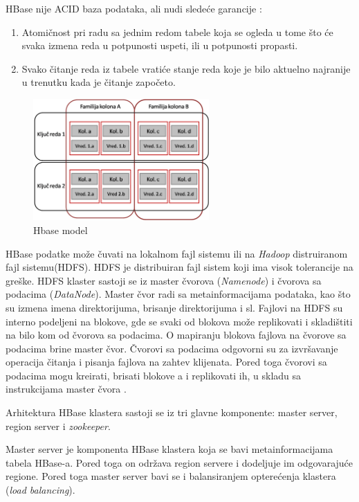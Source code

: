 \documentclass[12pt,oneside]{memoir}
\begin{document}
HBase nije ACID baza podataka, ali nudi sledeće garancije \cite{hbaseACID}: 

\begin{enumerate}
\item[\textbullet] Atomičnost pri radu sa jednim redom tabele koja se ogleda u tome što će svaka izmena reda u potpunosti uspeti, ili u potpunosti propasti.
\item[\textbullet] Svako čitanje reda iz tabele vratiće stanje reda koje je bilo aktuelno najranije u trenutku kada je čitanje započeto. 
\end{enumerate}

\begin{figure}[!ht]
  \centering
  \includegraphics[width=0.6\textwidth]{colFamily.png}
  \caption{Hbase model}
  \label{fig:grafikon}
\end{figure}

HBase podatke može čuvati na lokalnom fajl sistemu ili na \textit{Hadoop} distruiranom fajl sistemu(HDFS). HDFS je distribuiran fajl sistem koji ima visok tolerancije na greške. HDFS klaster sastoji se iz master čvorova (\textit{Namenode}) i čvorova sa podacima (\textit{DataNode}). Master čvor radi sa metainformacijama podataka, kao što su izmena imena direktorijuma, brisanje direktorijuma i sl. Fajlovi na HDFS su interno podeljeni na blokove, gde se svaki od blokova može replikovati i skladištiti na bilo kom od čvorova sa podacima. O mapiranju blokova fajlova na čvorove sa podacima brine master čvor. Čvorovi sa podacima odgovorni su za izvršavanje operacija čitanja i pisanja fajlova na zahtev klijenata. Pored toga čvorovi sa podacima mogu kreirati, brisati blokove a i replikovati ih, u skladu sa instrukcijama master čvora \cite{hdfs}.

Arhitektura HBase klastera sastoji se iz tri glavne komponente: master server, region server i \textit{zookeeper}.

Master server  je komponenta HBase klastera koja se bavi metainformacijama tabela HBase-a. Pored toga on održava region servere i dodeljuje im odgovarajuće regione. Pored toga master server bavi se i balansiranjem opterećenja klastera (\textit{load balancing}).
\end{document}
